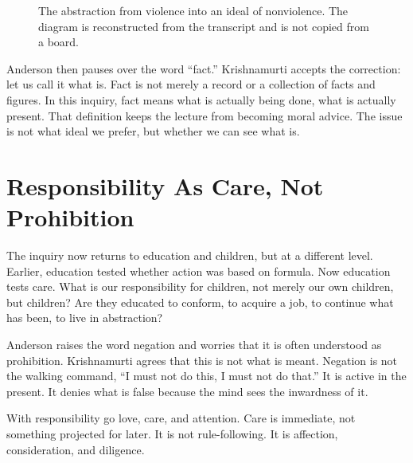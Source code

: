 \begin{figure}
\centering
{}
\caption{The abstraction from violence into an ideal of nonviolence. The diagram is reconstructed from the transcript and is not copied from a board.}
\end{figure}

Anderson then pauses over the word ``fact.'' Krishnamurti accepts the correction: let us call it what is. Fact is not merely a record or a collection of facts and figures. In this inquiry, fact means what is actually being done, what is actually present. That definition keeps the lecture from becoming moral advice. The issue is not what ideal we prefer, but whether we can see what is.

\section{Responsibility As Care, Not Prohibition}

The inquiry now returns to education and children, but at a different level. Earlier, education tested whether action was based on formula. Now education tests care. What is our responsibility for children, not merely our own children, but children? Are they educated to conform, to acquire a job, to continue what has been, to live in abstraction?

Anderson raises the word negation and worries that it is often understood as prohibition. Krishnamurti agrees that this is not what is meant. Negation is not the walking command, ``I must not do this, I must not do that.'' It is active in the present. It denies what is false because the mind sees the inwardness of it.

With responsibility go love, care, and attention. Care is immediate, not something projected for later. It is not rule-following. It is affection, consideration, and diligence.

